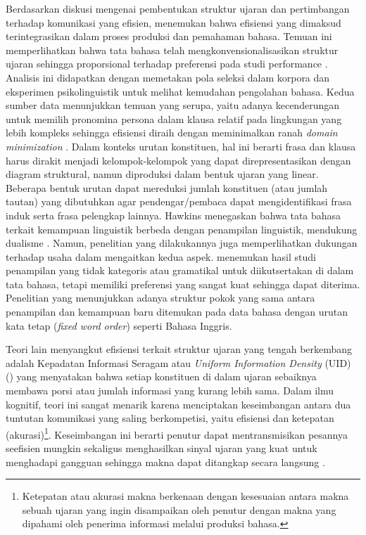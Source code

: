 Berdasarkan diskusi mengenai pembentukan struktur ujaran dan pertimbangan terhadap komunikasi yang efisien, \cite{hawkins2004efficiency} menemukan bahwa efisiensi yang dimaksud terintegrasikan dalam proses produksi dan pemahaman bahasa. Temuan ini memperlihatkan bahwa tata bahasa telah mengkonvensionalisasikan struktur ujaran sehingga proporsional terhadap preferensi pada studi performance \citep{hawkins2004efficiency}. Analisis ini didapatkan dengan memetakan pola seleksi dalam korpora dan eksperimen psikolinguistik untuk melihat kemudahan pengolahan bahasa. Kedua sumber data menunjukkan temuan yang serupa, yaitu adanya kecenderungan untuk memilih pronomina persona dalam klausa relatif pada lingkungan yang lebih kompleks sehingga efisiensi diraih dengan meminimalkan ranah \textit{domain minimization} \citep{hawkins2004efficiency}. Dalam konteks urutan konstituen, hal ini berarti frasa dan klausa harus dirakit menjadi kelompok-kelompok yang dapat direpresentasikan dengan diagram struktural, namun diproduksi dalam bentuk ujaran yang linear. Beberapa bentuk urutan dapat mereduksi jumlah konstituen (atau jumlah tautan) yang dibutuhkan agar pendengar/pembaca dapat mengidentifikasi frasa induk serta frasa pelengkap lainnya. Hawkins menegaskan bahwa tata bahasa terkait kemampuan linguistik berbeda dengan penampilan linguistik, mendukung dualisme \cite{chomsky1965syntactic}. Namun, penelitian yang dilakukannya juga memperlihatkan dukungan terhadap usaha dalam mengaitkan kedua aspek. \cite{hawkins2004efficiency} menemukan hasil studi penampilan yang tidak kategoris atau gramatikal untuk diikutsertakan di dalam tata bahasa, tetapi memiliki preferensi yang sangat kuat sehingga dapat diterima. Penelitian \cite{hawkins2004efficiency} yang menunjukkan adanya struktur pokok yang sama antara penampilan dan kemampuan baru ditemukan pada data bahasa dengan urutan kata tetap (\textit{fixed word order}) seperti Bahasa Inggris. 

Teori lain menyangkut efisiensi terkait struktur ujaran yang tengah berkembang adalah Kepadatan Informasi Seragam atau \textit{Uniform Information Density} (UID) (\citealp{jaeger2007speakers, frank2008speaking}) yang menyatakan bahwa setiap konstituen di dalam ujaran  sebaiknya membawa porsi atau jumlah informasi yang kurang lebih sama. Dalam ilmu kognitif, teori ini sangat menarik karena menciptakan keseimbangan antara dua tuntutan komunikasi yang saling berkompetisi, yaitu efisiensi dan ketepatan (akurasi)\footnote{Ketepatan atau akurasi makna berkenaan dengan kesesuaian antara makna sebuah ujaran yang ingin disampaikan oleh penutur dengan makna yang dipahami oleh penerima informasi melalui produksi bahasa.}. Keseimbangan ini berarti penutur dapat mentransmisikan pesannya seefisien mungkin sekaligus menghasilkan sinyal ujaran yang kuat untuk menghadapi gangguan sehingga makna dapat ditangkap secara langsung \citep{jaeger2007speakers}.

